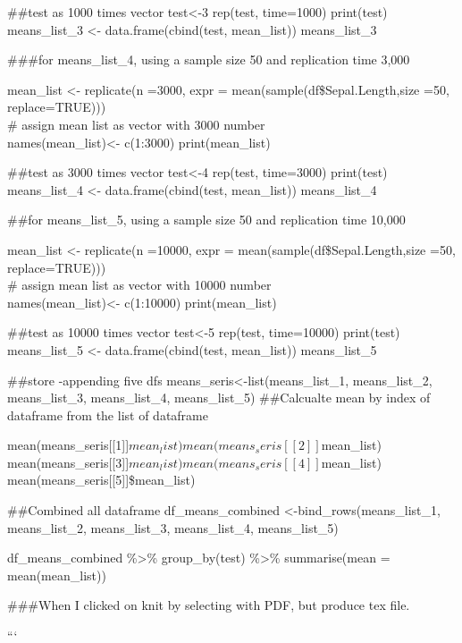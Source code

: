 \documentclass[
]{article}
\begin{document}
\#\#test as 1000 times vector test\textless-3 rep(test, time=1000)
print(test) means\_list\_3 \textless- data.frame(cbind(test,
mean\_list)) means\_list\_3

\#\#\#for means\_list\_4, using a sample size 50 and replication time
3,000

mean\_list \textless- replicate(n =3000, expr =
mean(sample(df\$Sepal.Length,size =50, replace=TRUE)))\\
\# assign mean list as vector with 3000 number\\
names(mean\_list)\textless- c(1:3000) print(mean\_list)

\#\#test as 3000 times vector test\textless-4 rep(test, time=3000)
print(test) means\_list\_4 \textless- data.frame(cbind(test,
mean\_list)) means\_list\_4

\#\#for means\_list\_5, using a sample size 50 and replication time
10,000

mean\_list \textless- replicate(n =10000, expr =
mean(sample(df\$Sepal.Length,size =50, replace=TRUE)))\\
\# assign mean list as vector with 10000 number\\
names(mean\_list)\textless- c(1:10000) print(mean\_list)

\#\#test as 10000 times vector test\textless-5 rep(test, time=10000)
print(test) means\_list\_5 \textless- data.frame(cbind(test,
mean\_list)) means\_list\_5

\#\#store -appending five dfs means\_seris\textless-list(means\_list\_1,
means\_list\_2, means\_list\_3, means\_list\_4, means\_list\_5)
\#\#Calcualte mean by index of dataframe from the list of dataframe

mean(means\_seris{[}{[}1{]}{]}\(mean_list) mean(means_seris[[2]]\)mean\_list)
mean(means\_seris{[}{[}3{]}{]}\(mean_list) mean(means_seris[[4]]\)mean\_list)
mean(means\_seris{[}{[}5{]}{]}\$mean\_list)

\#\#Combined all dataframe df\_means\_combined
\textless-bind\_rows(means\_list\_1, means\_list\_2, means\_list\_3,
means\_list\_4, means\_list\_5)

df\_means\_combined \%\textgreater\% group\_by(test) \%\textgreater\%
summarise(mean = mean(mean\_list))

\#\#\#When I clicked on knit by selecting with PDF, but produce tex
file.

```
\end{document}
